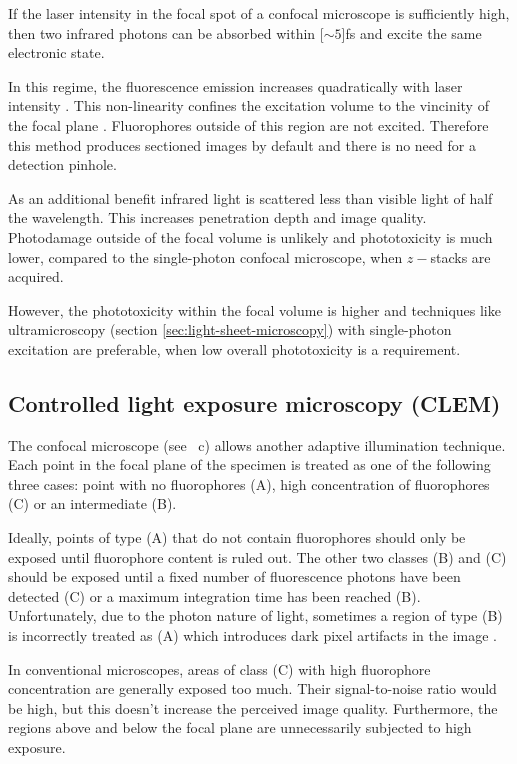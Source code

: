 If the laser intensity in the focal spot of a confocal microscope is
sufficiently high, then two infrared photons can be absorbed within
\unit[$\sim 5$]{fs} and excite the same electronic state.

In this regime, the fluorescence emission increases quadratically with
laser intensity \citep{goppert1931elementarakte}. This non-linearity
confines the excitation volume to the vincinity of the focal plane
\citep{Denk1990}. Fluorophores outside of this region are not
excited. Therefore this method produces sectioned images by default
and there is no need for a detection pinhole.

As an additional benefit infrared light is scattered less than visible
light of half the wavelength. This increases penetration depth and
image quality. Photodamage outside of the focal volume is unlikely and
phototoxicity is much lower, compared to the single-photon confocal
microscope, when $z-$stacks are acquired.

However, the phototoxicity within the focal volume is higher and
techniques like ultramicroscopy (section
\ref{sec:light-sheet-microscopy}) with single-photon excitation are
preferable, when low overall phototoxicity is a requirement.
\subsection{Controlled light exposure microscopy (CLEM)}
\label{sec:CLEM}
The confocal microscope (see ~c)
allows another adaptive illumination technique. Each point in the
focal plane of the specimen is treated as one of the following three
cases: point with no fluorophores (A), high concentration of
fluorophores (C) or an intermediate (B).

Ideally, points of type (A) that do not contain fluorophores should
only be exposed until fluorophore content is ruled out. The other two
classes (B) and (C) should be exposed until a fixed number of
fluorescence photons have been detected (C) or a maximum integration
time has been reached (B). Unfortunately, due to the photon nature of
light, sometimes a region of type (B) is incorrectly treated as (A)
which introduces dark pixel artifacts in the image
\citep{Hoebe2010}.

In conventional microscopes, areas of class (C) with high fluorophore
concentration are generally exposed too much. Their signal-to-noise
ratio would be high, but this doesn't increase the perceived image
quality. Furthermore, the regions above and below the focal plane are
unnecessarily subjected to high exposure.

